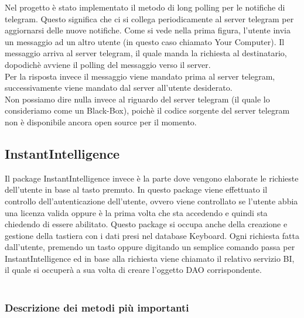 Nel progetto è stato implementato il metodo di long polling per le notifiche di telegram. Questo significa che ci si collega periodicamente al server telegram per aggiornarsi delle nuove notifiche. Come si vede nella prima figura, l’utente invia un messaggio ad un altro utente (in questo caso chiamato Your Computer). Il messaggio arriva al server telegram, il quale manda la richiesta al destinatario, dopodichè avviene il polling del messaggio verso il server. \\
Per la risposta invece il messaggio viene mandato prima al server telegram, successivamente viene mandato dal server all’utente desiderato.
\\Non possiamo dire nulla invece al riguardo del server telegram (il quale lo consideriamo come un Black-Box), poichè il codice sorgente del server telegram  non è disponibile ancora open source per il momento.


%


\subsection{InstantIntelligence}

Il package InstantIntelligence invece è la parte dove vengono elaborate le richieste dell’utente in base al tasto premuto. In questo package viene effettuato il controllo dell’autenticazione dell’utente, ovvero viene controllato se l’utente abbia una licenza valida oppure è la prima volta che sta accedendo e quindi sta chiedendo di essere abilitato.  Questo package si occupa anche della creazione e gestione della tastiera con i dati presi nel database Keyboard. Ogni richiesta fatta dall’utente, premendo un tasto oppure digitando un semplice comando passa per InstantIntelligence ed in base alla richiesta viene chiamato il relativo servizio BI, il quale si occuperà a sua volta di creare l’oggetto DAO corrispondente. \\\\

\subsubsection{Descrizione dei metodi più importanti}


